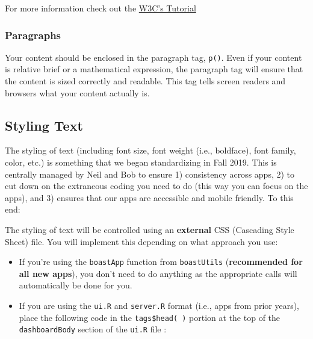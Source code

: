 \documentclass[
]{book}
\providecommand{\tightlist}{%
  \setlength{\itemsep}{0pt}\setlength{\parskip}{0pt}}
\begin{document}
For more information check out the \href{https://www.w3.org/WAI/tutorials/page-structure/headings/}{W3C's Tutorial}

\hypertarget{paragraphs}{%
\subsubsection{Paragraphs}\label{paragraphs}}

Your content should be enclosed in the paragraph tag, \texttt{p()}. Even if your content is relative brief or a mathematical expression, the paragraph tag will ensure that the content is sized correctly and readable. This tag tells screen readers and browsers what your content actually is.

\hypertarget{textStyle}{%
\subsection{Styling Text}\label{textStyle}}

The styling of text (including font size, font weight (i.e., boldface), font family, color, etc.) is something that we began standardizing in Fall 2019. This is centrally managed by Neil and Bob to ensure 1) consistency across apps, 2) to cut down on the extraneous coding you need to do (this way you can focus on the apps), and 3) ensures that our apps are accessible and mobile friendly. To this end:

The styling of text will be controlled using an \textbf{external} CSS (Cascading Style Sheet) file. You will implement this depending on what approach you use:

\begin{itemize}
\tightlist
\item
  If you're using the \texttt{boastApp} function from \texttt{boastUtils} (\textbf{recommended for all new apps}), you don't need to do anything as the appropriate calls will automatically be done for you.
\item
  If you are using the \texttt{ui.R} and \texttt{server.R} format (i.e., apps from prior years), place the following code in the \texttt{tags\$head(\ )} portion at the top of the \texttt{dashboardBody} section of the \texttt{ui.R} file :
\end{itemize}
\end{document}
